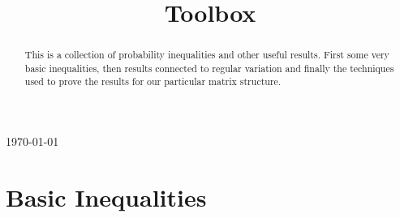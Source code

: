 \documentclass[11pt,reqno]{amsart}
\newcommand{\1}{\mathds{1}}
\newcommand{\0}{\boldsymbol{0}}
\newcommand{\4}{\mathchoice{\mskip1.5mu}{\mskip1.5mu}{}{}}
\newcommand{\5}{\mathchoice{\mskip-1.5mu}{\mskip-1.5mu}{}{}}
\newcommand{\2}{\penalty250\mskip\thickmuskip\mskip-\thinmuskip} %
\begin{document}
\today

\title[Toolbox]{Toolbox}
\begin{abstract}
This is a collection of probability inequalities and other useful results. First some very basic inequalities, then results connected to regular variation and finally the techniques used to prove the results for our particular matrix structure. 
\end{abstract}

\maketitle

\section{Basic Inequalities}\setcounter{equation}{0}
\end{document}
